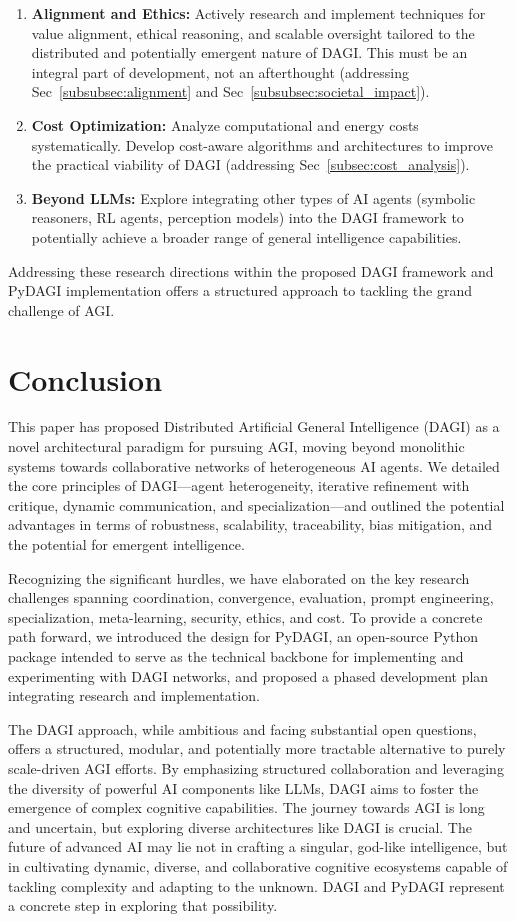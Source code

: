 \documentclass[12pt]{amsart}
\begin{document}
\begin{enumerate}[leftmargin=*]
    \item \textbf{Alignment and Ethics:} Actively research and implement techniques for value alignment, ethical reasoning, and scalable oversight tailored to the distributed and potentially emergent nature of DAGI. This must be an integral part of development, not an afterthought (addressing Sec~\ref{subsubsec:alignment} and Sec~\ref{subsubsec:societal_impact}).
    \item \textbf{Cost Optimization:} Analyze computational and energy costs systematically. Develop cost-aware algorithms and architectures to improve the practical viability of DAGI (addressing Sec~\ref{subsec:cost_analysis}).
    \item \textbf{Beyond LLMs:} Explore integrating other types of AI agents (symbolic reasoners, RL agents, perception models) into the DAGI framework to potentially achieve a broader range of general intelligence capabilities.
\end{enumerate}
Addressing these research directions within the proposed DAGI framework and PyDAGI implementation offers a structured approach to tackling the grand challenge of AGI.

\section{Conclusion}
\label{sec:conclusion}
This paper has proposed Distributed Artificial General Intelligence (DAGI) as a novel architectural paradigm for pursuing AGI, moving beyond monolithic systems towards collaborative networks of heterogeneous AI agents. We detailed the core principles of DAGI—agent heterogeneity, iterative refinement with critique, dynamic communication, and specialization—and outlined the potential advantages in terms of robustness, scalability, traceability, bias mitigation, and the potential for emergent intelligence.

Recognizing the significant hurdles, we have elaborated on the key research challenges spanning coordination, convergence, evaluation, prompt engineering, specialization, meta-learning, security, ethics, and cost. To provide a concrete path forward, we introduced the design for PyDAGI, an open-source Python package intended to serve as the technical backbone for implementing and experimenting with DAGI networks, and proposed a phased development plan integrating research and implementation.

The DAGI approach, while ambitious and facing substantial open questions, offers a structured, modular, and potentially more tractable alternative to purely scale-driven AGI efforts. By emphasizing structured collaboration and leveraging the diversity of powerful AI components like LLMs, DAGI aims to foster the emergence of complex cognitive capabilities. The journey towards AGI is long and uncertain, but exploring diverse architectures like DAGI is crucial. The future of advanced AI may lie not in crafting a singular, god-like intelligence, but in cultivating dynamic, diverse, and collaborative cognitive ecosystems capable of tackling complexity and adapting to the unknown. DAGI and PyDAGI represent a concrete step in exploring that possibility.
\end{document}
